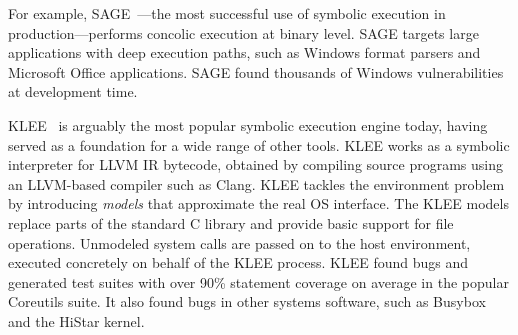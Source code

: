 For example, SAGE~\cite{sage2012,godefroid:fuzz}---the most successful use of symbolic execution in production---performs concolic execution at binary level.
%
SAGE targets large applications with deep execution paths, such as Windows format parsers and Microsoft Office applications.
%
SAGE found thousands of Windows vulnerabilities at development time.



KLEE~\cite{klee} is arguably the most popular symbolic execution engine today, having served as a foundation for a wide range of other tools.
%
KLEE works as a symbolic interpreter for LLVM IR bytecode, obtained by compiling source programs using an LLVM-based compiler such as Clang.
%
KLEE tackles the environment problem by introducing \emph{models} that approximate the real OS interface.  The KLEE models replace parts of the standard C library and provide basic support for file operations.  Unmodeled system calls are passed on to the host environment, executed concretely on behalf of the KLEE process.
%
KLEE found bugs and generated test suites with over 90\% statement coverage on average in the popular Coreutils suite.  It also found bugs in other systems software, such as Busybox and the HiStar kernel.

